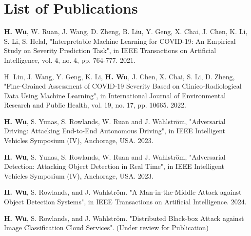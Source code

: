 \chapter*{List of Publications}

\noindent \textbf{H. Wu}, W. Ruan, J. Wang, D. Zheng, B. Liu, Y. Geng, X. Chai, J. Chen, K. Li, S. Li, S. Helal, "Interpretable Machine Learning for COVID-19: An Empirical Study on Severity Prediction Task", in IEEE Transactions on Artificial Intelligence, vol. 4, no. 4, pp. 764-777. 2021.

\vspace{4pt}

\noindent
H. Liu, J. Wang, Y. Geng, K. Li, \textbf{H. Wu}, J. Chen, X. Chai, S. Li, D. Zheng, "Fine-Grained Assessment of COVID-19 Severity Based on Clinico-Radiological Data Using Machine Learning", in International Journal of Environmental Research and Public Health, vol. 19, no. 17, pp. 10665. 2022.

\vspace{4pt}

\noindent
\textbf{H. Wu}, S. Yunas, S. Rowlands, W. Ruan and J. Wahlström, "Adversarial Driving: Attacking End-to-End Autonomous Driving", in IEEE Intelligent Vehicles Symposium (IV), Anchorage, USA. 2023.

\vspace{4pt}

\noindent
\textbf{H. Wu}, S. Yunas, S. Rowlands, W. Ruan and J. Wahlström, "Adversarial Detection: Attacking Object Detection in Real Time", in IEEE Intelligent Vehicles Symposium (IV), Anchorage, USA. 2023.

\vspace{4pt}

\noindent
\textbf{H. Wu}, S. Rowlands, and J. Wahlström. "A Man-in-the-Middle Attack against Object Detection Systems", in IEEE Transactions on Artificial Intelligence. 2024.

\vspace{4pt}

\noindent
\textbf{H. Wu}, S. Rowlands, and J. Wahlström. "Distributed Black-box Attack against Image Classification Cloud Services". (Under review for Publication)


